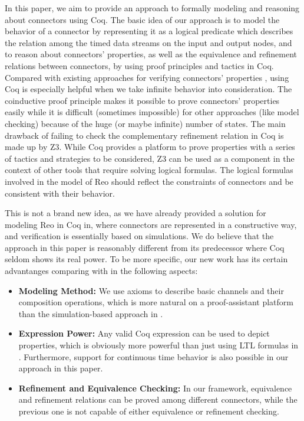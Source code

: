 \documentclass[3p,times]{elsarticle}
\begin{document}
In this paper, we aim to provide an approach to formally modeling and reasoning about connectors using Coq.
The basic idea of our
approach is to model the behavior of a connector by representing it as a logical predicate which describes the relation among
the timed data streams on the input and output nodes, and to reason about connectors' properties, as
well as the equivalence and refinement relations
between connectors, by using proof principles and tactics in Coq.
Compared with existing approaches for verifying connectors' properties \cite{BBK+10,KB09,KKV12}, using Coq is especially helpful when
we take infinite behavior into consideration. The coinductive proof principle makes it possible to prove connectors' properties easily while it
is difficult (sometimes impossible) for other approaches (like model checking) because of the huge (or maybe infinite) number of states. The main drawback of failing to check the complementary refinement relation in Coq is made up by Z3.
While Coq provides a platform to prove properties with a series of tactics and strategies to be considered, Z3 can be used as a component in the context of other tools that require solving logical formulas. The logical formulas involved in the model of Reo should reflect the constraints of connectors and be consistent with their behavior.

This is not a brand new idea, as we have already provided a solution for modeling Reo in Coq in\cite{LS15}, where connectors are represented in a constructive way, and
verification is essentially based on simulations. We do believe that the approach in this paper is reasonably different from
its predecessor where Coq seldom shows its real power. To be more specific, our new work has its certain
advantanges comparing with \cite{LS15} in the following
aspects:
\begin{itemize}
\item {\bf Modeling Method:} We use axioms to describe basic channels and their composition operations, which is more natural on a proof-assistant
platform than the simulation-based approach in \cite{LS15}.
\item {\bf Expression Power:} Any valid Coq expression can be used to depict properties, which is obviously more powerful than just using LTL formulas in
\cite{LS15}. Furthermore, support for continuous time behavior is also
possible in our approach in this paper.
\item {\bf Refinement and Equivalence Checking:} In our framework, equivalence and refinement relations can be proved among different connectors, while the previous one is not capable of either equivalence or refinement checking.
\end{itemize}
\end{document}
